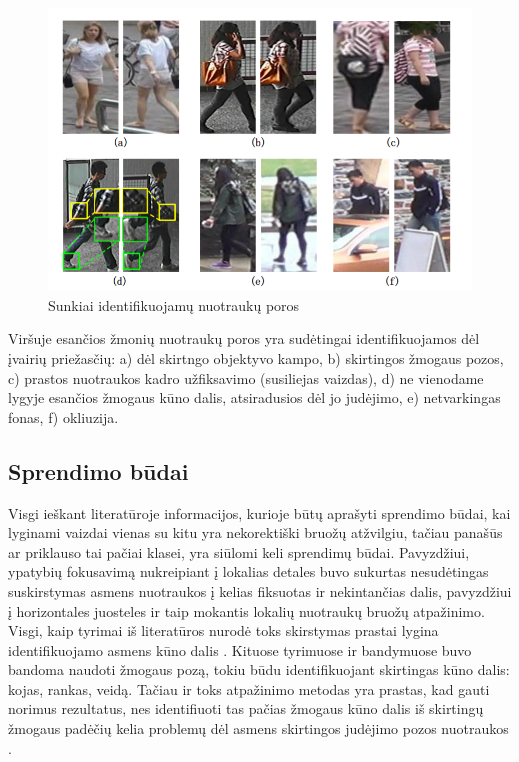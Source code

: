 \documentclass{VUMIFPSkursinis}
\DeclareRobustCommand{\[}{\begin{equation}}
\DeclareRobustCommand{\]}{\end{equation}}
\begin{document}
\begin{figure}[H]
\centering
\includegraphics[scale=1.0]{img/image_diff_examples.png}
\caption{Sunkiai identifikuojamų nuotraukų poros} %
\label{img:mlp}
\end{figure}
Viršuje esančios žmonių nuotraukų poros yra sudėtingai identifikuojamos dėl įvairių priežasčių: a) dėl skirtngo objektyvo kampo, b) skirtingos žmogaus pozos, c) prastos nuotraukos kadro užfiksavimo (susiliejas vaizdas), d) ne vienodame lygyje esančios žmogaus kūno dalis, atsiradusios dėl jo judėjimo, e) netvarkingas fonas, f) okliuzija.

\subsection{Sprendimo būdai}
Visgi ieškant literatūroje informacijos, kurioje būtų aprašyti sprendimo būdai, kai lyginami vaizdai vienas su kitu yra nekorektiški bruožų atžvilgiu, tačiau panašūs ar priklauso tai pačiai klasei, yra siūlomi keli sprendimų būdai. Pavyzdžiui, ypatybių fokusavimą nukreipiant į lokalias detales buvo sukurtas nesudėtingas suskirstymas asmens nuotraukos į kelias fiksuotas ir nekintančias dalis, pavyzdžiui į horizontales juosteles ir taip mokantis lokalių nuotraukų bruožų atpažinimo. Visgi, kaip tyrimai iš literatūros nurodė toks skirstymas prastai lygina identifikuojamo asmens kūno dalis \cite{Person_reindentification}. Kituose tyrimuose ir bandymuose buvo bandoma naudoti žmogaus pozą, tokiu būdu identifikuojant skirtingas kūno dalis: kojas, rankas, veidą. Tačiau ir toks atpažinimo metodas yra prastas, kad gauti norimus rezultatus, nes identifiuoti tas pačias žmogaus kūno dalis iš skirtingų žmogaus padėčių kelia problemų dėl asmens skirtingos judėjimo pozos nuotraukos \cite{Person_reindentification}.
\pagebreak
\end{document}
